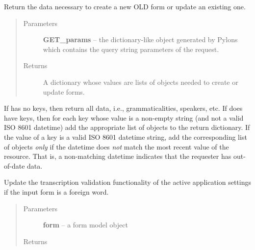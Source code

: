 \documentclass[letterpaper,10pt,english]{sphinxmanual}
\begin{document}
\begin{fulllineitems}
\label{api:onlinelinguisticdatabase.controllers.forms.getNewEditFormData}
Return the data necessary to create a new OLD form or update an existing one.
\begin{quote}\begin{description}
\item[{Parameters}] \leavevmode
\textbf{GET\_params} -- the  dictionary-like object generated by
Pylons which contains the query string parameters of the request.

\item[{Returns}] \leavevmode
A dictionary whose values are lists of objects needed to create or
update forms.

\end{description}\end{quote}

If  has no keys, then return all data, i.e., grammaticalities,
speakers, etc.  If  does have keys, then for each key whose
value is a non-empty string (and not a valid ISO 8601 datetime) add the
appropriate list of objects to the return dictionary.  If the value of a key
is a valid ISO 8601 datetime string, add the corresponding list of objects
\emph{only} if the datetime does \emph{not} match the most recent 
value of the resource.  That is, a non-matching datetime indicates that the
requester has out-of-date data.

\end{fulllineitems}


\begin{fulllineitems}
\label{api:onlinelinguisticdatabase.controllers.forms.updateApplicationSettingsIfFormIsForeignWord}
Update the transcription validation functionality of the active application settings if the input form is a foreign word.
\begin{quote}\begin{description}
\item[{Parameters}] \leavevmode
\textbf{form} -- a form model object

\item[{Returns}] \leavevmode
{}

\end{description}\end{quote}

\end{fulllineitems}
\end{document}
